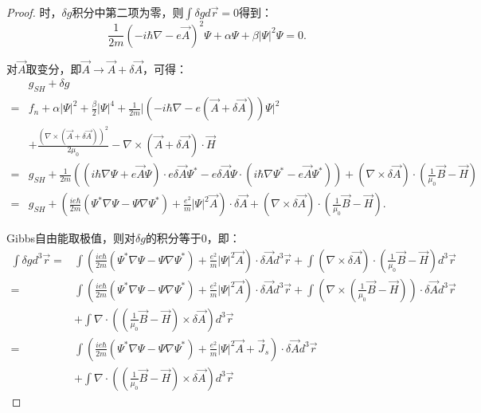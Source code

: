 \documentclass[reqno,a4paper,12pt]{amsart}
\begin{document}
\begin{enumerate}[1.]
\begin{proof}
时，$\delta g$积分中第二项为零，则$\int \delta g d\vec{r} = 0$得到：
\[
	\frac{1}{2m}(-i\hbar\nabla-e\vec{A})^2\Psi + \alpha \Psi + \beta \vert \Psi \vert^2 \Psi = 0.
\]

对$\vec{A}$取变分，即$\vec{A} \to \vec{A} + \delta \vec{A}$，可得：
\begin{align*}
	&g_{SH} + \delta g \\
	=& f_n + \alpha\vert \Psi \vert^2 + \frac{\beta}{2} \vert \Psi \vert^4 + \frac{1}{2m} \vert (-i\hbar\nabla - e(\vec{A}+\delta\vec{A})) \Psi \vert^2 \\
	&+ \frac{(\nabla \times (\vec{A}+\delta\vec{A}))^2}{2\mu_0} - \nabla \times (\vec{A}+\delta\vec{A}) \cdot \vec{H} \\
	=& g_{SH} + \frac{1}{2m}((i\hbar\nabla\Psi + e\vec{A}\Psi) \cdot e\delta\vec{A} \Psi^* - e\delta\vec{A}\Psi \cdot (i\hbar\nabla\Psi^*-e\vec{A}\Psi^*)) + (\nabla \times \delta\vec{A}) \cdot \left( \frac{1}{\mu_0}\vec{B} - \vec{H} \right) \\
	=& g_{SH} + \left( \frac{ie\hbar}{2m}(\Psi^*\nabla\Psi-\Psi\nabla\Psi^*) + \frac{e^2}{m} \vert \Psi \vert^2 \vec{A} \right) \cdot \delta\vec{A} + (\nabla \times \delta\vec{A}) \cdot \left( \frac{1}{\mu_0}\vec{B} - \vec{H} \right).
\end{align*}

Gibbs自由能取极值，则对$\delta g$的积分等于0，即：
\begin{align*}
	\int \delta g d^3\vec{r} =& \int \left( \frac{ie\hbar}{2m}(\Psi^*\nabla\Psi-\Psi\nabla\Psi^*) + \frac{e^2}{m} \vert \Psi \vert^2 \vec{A} \right) \cdot \delta \vec{A} d^3\vec{r} + \int (\nabla \times \delta\vec{A}) \cdot \left( \frac{1}{\mu_0}\vec{B} - \vec{H} \right) d^3\vec{r} \\
	=& \int \left( \frac{ie\hbar}{2m}(\Psi^*\nabla\Psi-\Psi\nabla\Psi^*) + \frac{e^2}{m} \vert \Psi \vert^2 \vec{A} \right) \cdot \delta \vec{A} d^3\vec{r} + \int \left( \nabla \times \left( \frac{1}{\mu_0}\vec{B} - \vec{H} \right) \right) \cdot \delta\vec{A} d^3\vec{r} \\
	&+ \int \nabla \cdot \left( \left( \frac{1}{\mu_0}\vec{B} - \vec{H} \right) \times \delta \vec{A} \right) d^3\vec{r} \\
	=& \int \left( \frac{ie\hbar}{2m}(\Psi^*\nabla\Psi-\Psi\nabla\Psi^*) + \frac{e^2}{m} \vert \Psi \vert^2 \vec{A} + \vec{J}_s \right) \cdot \delta \vec{A} d^3\vec{r} \\
	&+ \int \nabla \cdot \left( \left( \frac{1}{\mu_0}\vec{B} - \vec{H} \right) \times \delta \vec{A} \right) d^3\vec{r}
\end{align*}


\end{proof}
\end{enumerate}
\end{document}
